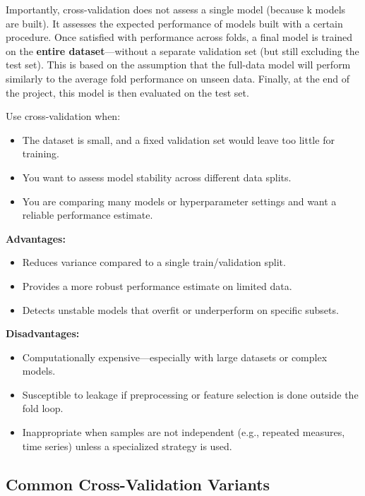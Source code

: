 \documentclass[12pt,openany]{book}
\begin{document}
Importantly, cross-validation does not assess a single model (because k models are built).
It assesses the expected performance of models built with a certain procedure. Once satisfied with performance across folds, a final model is trained on the \textbf{entire dataset}—without a separate validation set (but still excluding the test set). This is based on the assumption that the full-data model will perform similarly to the average fold performance on unseen data. Finally, at the end of the project, this model is then evaluated on the test set.
\newline

Use cross-validation when:
\begin{itemize}
    \item The dataset is small, and a fixed validation set would leave too little for training.
    \item You want to assess model stability across different data splits.
    \item You are comparing many models or hyperparameter settings and want a reliable performance estimate.
\end{itemize} 

\textbf{Advantages:}
\begin{itemize}
    \item Reduces variance compared to a single train/validation split.
    \item Provides a more robust performance estimate on limited data.
    \item Detects unstable models that overfit or underperform on specific subsets.
\end{itemize} 

\textbf{Disadvantages:}
\begin{itemize}
    \item Computationally expensive—especially with large datasets or complex models.
    \item Susceptible to leakage if preprocessing or feature selection is done outside the fold loop.
    \item Inappropriate when samples are not independent (e.g., repeated measures, time series) unless a specialized strategy is used.
\end{itemize} 

\subsection{Common Cross-Validation Variants}
\end{document}

